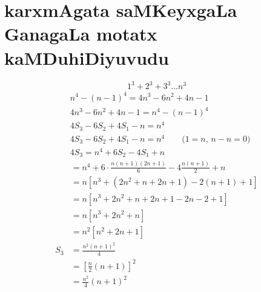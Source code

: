 \chapter{karxmAgata saMKeyxgaLa GanagaLa motatx kaMDuhiDiyuvudu}

$$
1^3+2^3+3^3\ldots n^3
$$
\begin{align*}
&n^4 - (n-1)^4 = 4n^3 - 6n^2 +4n -1\\
&4n^{3}-6n^2 + 4n -1 = n^4 - (n-1)^4\\
&4S_{3} - 6S_{2} +4S_{1} -n = n^4\\
&4S_{3}-6S_{2} +4S_{1}-n = n^4 \qquad\text{($1=n$, $n-n =0$)}\\
&4S_{3} = n^4 +6S_{2} -4S_{1} +n
\end{align*}
\begin{align*}
&=n^4+6\cdot \frac{n(n+1)(2n+1)}{6} -4 \frac{n(n+1)}{2}+n\\
&=n\left[n^3 + \left(2n^2 + n+2n +1\right) - 2(n+1) +1\right]\\
&=n\left[n^3+2n^2+n+2n+1-2n-2+1\right]\\
&=n\left[n^3+2n^{2}+n\right]\\
&=n^2\left[n^2+2n+1\right]\\
S_3&= \frac{n^2(n+1)^2}{4}\\
&=\left[\frac{n}{2}(n+1)\right]^2\\
&=\frac{n^2}{4}(n+1)^2
\end{align*}
